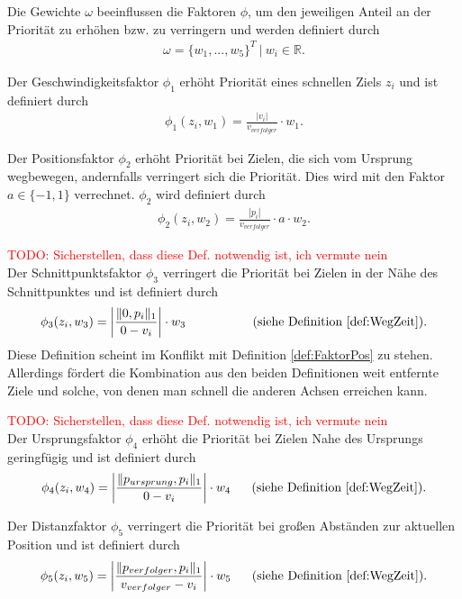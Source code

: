 \documentclass[german,version-2019-11]{uzl-thesis}
\begin{document}
\begin{definition}
Die Gewichte $\omega$ beeinflussen die Faktoren $\phi$, um den jeweiligen Anteil an der Priorität zu erhöhen bzw. zu verringern und werden definiert durch
\begin{align*}
\omega = \{w_1,...,w_5\}^T~|~w_i \in\mathbb{R}.
\end{align*}
\end{definition}
\begin{definition}
Der Geschwindigkeitsfaktor $\phi_1$ erhöht Priorität eines schnellen Ziels $z_i$ und ist definiert durch
\begin{align*}
\phi_1(z_i, w_1) = \frac{|v_i|}{v_{verfolger}}\cdot w_1.
\end{align*}
\end{definition}
\begin{definition}
\label{def:FaktorPos}
Der Positionsfaktor $\phi_2$ erhöht Priorität bei Zielen, die sich vom Ursprung wegbewegen, andernfalls verringert sich die Priorität. Dies wird mit den Faktor $a\in\{-1,1\}$ verrechnet. $\phi_2$ wird definiert durch 
\begin{align*}
\phi_2(z_i, w_2) = \frac{|p_i|}{v_{verfolger}}\cdot a \cdot w_2.
\end{align*}
\end{definition}
\begin{definition}
\textcolor{red}{TODO: Sicherstellen, dass diese Def. notwendig ist, ich vermute nein}\\
Der Schnittpunktsfaktor $\phi_3$ verringert die Priorität bei Zielen in der Nähe des Schnittpunktes und ist definiert durch
\begin{align*}
\phi_3(z_i, w_3) = \bigg\vert\frac{\|0,p_i\|_1}{0-v_i}\bigg\vert \cdot w_3 \text{~~~~~~~~~~~~~~~~(siehe Definition \ref{def:WegZeit})}.
\end{align*}
Diese Definition scheint im Konflikt mit Definition \ref{def:FaktorPos} zu stehen. Allerdings fördert die Kombination aus den beiden Definitionen weit entfernte Ziele und solche, von denen man schnell die anderen Achsen erreichen kann.
\end{definition}
\begin{definition}
\textcolor{red}{TODO: Sicherstellen, dass diese Def. notwendig ist, ich vermute nein}\\
Der Ursprungsfaktor $\phi_4$ erhöht die Priorität bei Zielen Nahe des Ursprungs geringfügig und ist definiert durch
\begin{align*}
\phi_4(z_i, w_4) = \bigg\vert\frac{\|p_{ursprung},p_i\|_1}{0-v_i}\bigg\vert \cdot w_4 \text{~~~~~(siehe Definition \ref{def:WegZeit})}.
\end{align*}
\end{definition}
\begin{definition}
Der Distanzfaktor $\phi_5$ verringert die Priorität bei großen Abständen zur aktuellen Position und ist definiert durch
\begin{align*}
\phi_5(z_i, w_5) = \bigg\vert\frac{\|p_{verfolger},p_i\|_1}{v_{verfolger}-v_i}\bigg\vert \cdot w_5 \text{~~~~~(siehe Definition \ref{def:WegZeit})}.
\end{align*}
\end{definition}
\end{document}
